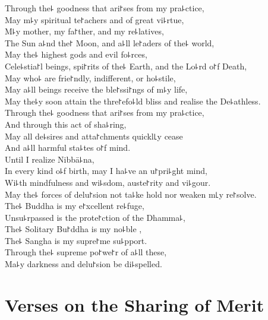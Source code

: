 Through the꜕ goodness that ari꜓ses from my pra꜕ctice,\\
May m꜕y spiritual te꜓achers and  of great vi꜕rtue,\\
M꜕y mother, my fa꜓ther, and my re꜕latives,\\
The Sun a꜕nd the꜓ Moon, and a꜕ll  le꜓aders of the꜕ world,\\
May the꜕ highest gods and evil fo꜕rces,\\
Cele꜕stia꜓l beings,  spi꜓rits of the꜕ Earth, and the Lo꜕rd o꜓f Death,\\
May  who꜕ are frie꜓ndly, indifferent, or ho꜕stile,\\
May a꜕ll beings receive the ble꜓ssi꜓ngs of m꜕y life,\\
May the꜕y soon attain the thre꜓efo꜕ld bliss and realise the De꜕athless.\\
Through the꜕ goodness that ari꜓ses from my pra꜕ctice,\\
And through this act of sha꜕ring,\\
May all de꜕sires and atta꜓chments quickl꜖y cease\\
And a꜕ll harmful sta꜕tes o꜓f mind.\\
Until I realize Nibbā꜕na,\\
In every kind o꜕f birth, may I ha꜕ve an u꜓pri꜕ght mind,\\
Wi꜕th mindfulness and wi꜕sdom, auste꜓rity and vi꜕gour.\\
May the꜕ forces of delu꜓sion not ta꜕ke hold nor weaken m꜖y re꜓solve.\\
The꜕ Buddha is my e꜓xcellent re꜕fuge,\\
Unsu꜕rpassed is the prote꜓ction of the Dhamma꜕,\\
The꜕ Solitary Bu꜓ddha is my no꜕ble ,\\
The꜕ Sangha is my supre꜓me su꜕pport.\\
Through the꜕ supreme po꜓we꜓r of a꜕ll these,\\
Ma꜕y darkness and delu꜓sion be di꜕spelled.

\chapter[Sharing of Merit]{Verses on the Sharing of Merit}%


\begin{leader}
\end{leader}

